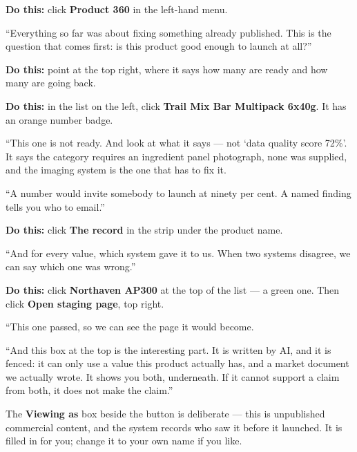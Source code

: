 \documentclass[11pt,a4paper]{article}
\newcommand{\ui}[1]{\textbf{#1}}          %
\begin{document}
\textbf{Do this:} click \ui{Product 360} in the left-hand menu.

\begin{say}
``Everything so far was about fixing something already published. This is the
question that comes first: is this product good enough to launch at all?''
\end{say}

\textbf{Do this:} point at the top right, where it says how many are ready and
how many are going back.

\textbf{Do this:} in the list on the left, click \ui{Trail Mix Bar Multipack
6x40g}. It has an orange number badge.

\begin{say}
``This one is not ready. And look at what it says --- not `data quality score
72\%'. It says the category requires an ingredient panel photograph, none was
supplied, and the imaging system is the one that has to fix it.

``A number would invite somebody to launch at ninety per cent. A named finding
tells you who to email.''
\end{say}

\textbf{Do this:} click \ui{The record} in the strip under the product name.

\begin{say}
``And for every value, which system gave it to us. When two systems disagree,
we can say which one was wrong.''
\end{say}

\textbf{Do this:} click \ui{Northaven AP300} at the top of the list --- a green
one. Then click \ui{Open staging page}, top right.

\begin{say}
``This one passed, so we can see the page it would become.

``And this box at the top is the interesting part. It is written by AI, and it
is fenced: it can only use a value this product actually has, and a market
document we actually wrote. It shows you both, underneath. If it cannot
support a claim from both, it does not make the claim.''
\end{say}

\begin{careful}
The \ui{Viewing as} box beside the button is deliberate --- this is unpublished
commercial content, and the system records who saw it before it launched. It is
filled in for you; change it to your own name if you like.
\end{careful}
\end{document}
